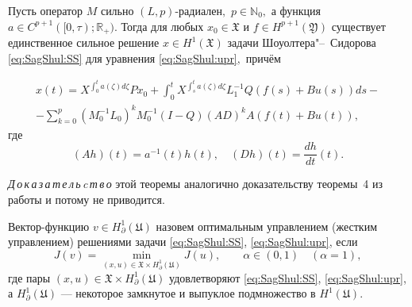 \smallskip

\begin{theorem}[3]Пусть оператор $M$ сильно $(L,p)$-радиален$,$ $p\in{\mathbb N}_0,$ а функция  $a\in C^{p+1}([0,\tau);{\mathbb R}_+).$
Тогда для любых $x_0\in{\mathfrak X}$ и $f\in H^{p+1}({\mathfrak Y})$
существует единственное сильное
решение $x \in H^1({\mathfrak X})$
задачи Шоуолтера"--~Сидорова \eqref{eq:SagShul:SS}
для уравнения \eqref{eq:SagShul:upr}$,$ причём %

\begin{multline}\label{eq:SagShul:reupr}
x(t) = X^{\displaystyle\int _0^t a(\zeta)d\zeta}P x_0 + \int _0^t
{X^{\displaystyle\int _s^t {a(\zeta)d\zeta}}L_1^{-1}Q(f(s)+Bu(s))ds}-
\\
-\sum_{k=0}^p(M_0^{-1}L_0)^kM_0^{-1}(I\!-\!Q)(AD)^{k}\!A\left(f(t)+Bu(t)\right),
\end{multline}
где $$(Ah)(t)=a^{-1}(t)h(t) ,\quad (Dh)(t)={\displaystyle\frac{dh}{dt}(t)}.$$
\end{theorem}

\smallskip

{\it Д\,о\,к\,а\,з\,а\,т\,е\,л\,ь\,c\,т\,в\,о}\/ этой теоремы аналогично доказательству теоремы~4 из работы \cite{SagShul:bib:SagBad} и потому не приводится.

\smallskip


\begin{definition}[5]
Вектор-функцию $v\in H_{\partial}^{1}({\mathfrak U})$ назовем оптимальным управлением (жестким управлением)  решениями задачи \eqref{eq:SagShul:SS}, \eqref{eq:SagShul:upr}, если
\begin{equation}\label{eq:SagShul:min}
J(v)=\min\limits_{(x,u)\in{\mathfrak X}\times H^{1}_{\partial}({\mathfrak U})} J(u),\qquad \alpha\in(0, 1)\quad (\alpha=1),
\end{equation}
где пары $(x,u)\in{\mathfrak X}\times H^{1}_{\partial}({\mathfrak U})$ удовлетворяют  \eqref{eq:SagShul:SS}, \eqref{eq:SagShul:upr}, а $H_{\partial}^{1}(\mathfrak U)$ --- некоторое замкнутое и выпуклое подмножество
 в $H^{1}\!(\mathfrak U)$.
\end{definition}

\smallskip



